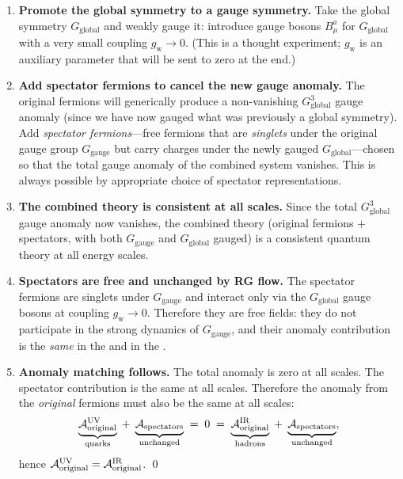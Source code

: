 \documentclass[11pt,a4paper]{article}
\begin{document}
\begin{enumerate}[label=\textbf{Step \arabic*:}, leftmargin=3.5em]
  \item \textbf{Promote the global symmetry to a gauge symmetry.}
    Take the global symmetry $G_{\text{global}}$ and weakly gauge it:
    introduce gauge bosons $B_\mu^a$ for $G_{\text{global}}$ with a very
    small coupling $g_{\text{w}} \to 0$.  (This is a thought experiment;
    $g_{\text{w}}$ is an auxiliary parameter that will be sent to zero at the
    end.)

  \item \textbf{Add spectator fermions to cancel the new gauge anomaly.}
    The original fermions will generically produce a non-vanishing
    $G_{\text{global}}^3$ gauge anomaly (since we have now gauged what was
    previously a global symmetry).  Add \emph{spectator fermions}---free
    fermions that are \emph{singlets} under the original gauge group
    $G_{\text{gauge}}$ but carry charges under the newly gauged
    $G_{\text{global}}$---chosen so that the total gauge anomaly of the
    combined system vanishes.  This is always possible by appropriate choice
    of spectator representations.

  \item \textbf{The combined theory is consistent at all scales.}
    Since the total $G_{\text{global}}^3$ gauge anomaly now vanishes, the
    combined theory (original fermions $+$ spectators, with both
    $G_{\text{gauge}}$ and $G_{\text{global}}$ gauged) is a consistent
    quantum theory at all energy scales.

  \item \textbf{Spectators are free and unchanged by RG flow.}
    The spectator fermions are singlets under $G_{\text{gauge}}$ and
    interact only via the $G_{\text{global}}$ gauge bosons at coupling
    $g_{\text{w}} \to 0$.  Therefore they are free fields: they do not
    participate in the strong dynamics of $G_{\text{gauge}}$, and their
    anomaly contribution is the \emph{same} in the \UV{} and in the \IR.

  \item \textbf{Anomaly matching follows.}
    The total anomaly is zero at all scales.  The spectator contribution is
    the same at all scales.  Therefore the anomaly from the \emph{original}
    fermions must also be the same at all scales:
    \[
      \underbrace{\mathcal{A}_{\text{original}}^{\mathrm{UV}}}_{\text{quarks}}
      \;+\;
      \underbrace{\mathcal{A}_{\text{spectators}}}_{\text{unchanged}}
      \;=\;
      0
      \;=\;
      \underbrace{\mathcal{A}_{\text{original}}^{\mathrm{IR}}}_{\text{hadrons}}
      \;+\;
      \underbrace{\mathcal{A}_{\text{spectators}}}_{\text{unchanged}},
    \]
    hence $\mathcal{A}_{\text{original}}^{\mathrm{UV}}
    = \mathcal{A}_{\text{original}}^{\mathrm{IR}}$. \qed
\end{enumerate}
\end{document}
